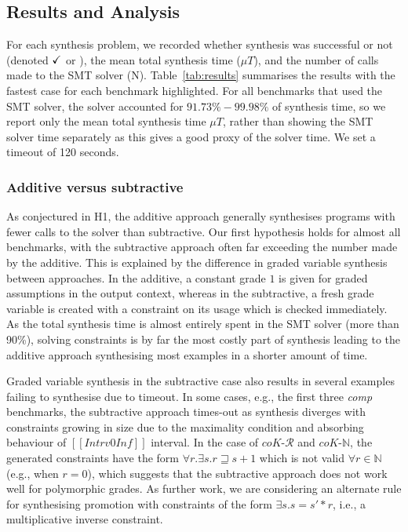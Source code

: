\subsection{Results and Analysis}
%
For each synthesis problem, we recorded whether synthesis was successful or not
(denoted $\checkmark$ or \fail), the mean total synthesis time ($\mu{T}$), and the
number of calls made to the SMT solver (\textsc{N}). Table~\ref{tab:results}
summarises the results with the fastest case for each benchmark highlighted. For
all benchmarks that used the SMT solver, the solver accounted for
$91.73\%-99.98\%$ of synthesis time, so we report only the mean total synthesis
time $\mu{T}$, rather than showing the SMT solver time separately as this gives
a good proxy of the solver time. We set a timeout of 120 seconds.

\subsubsection{Additive versus subtractive}

As conjectured in H1, the additive approach generally synthesises programs with
fewer calls to the solver than subtractive. Our first hypothesis holds for
almost all benchmarks, with the subtractive approach often far exceeding the
number made by the additive. This is explained by the difference in graded
variable synthesis between approaches. In the additive, a constant grade $1$ is
given for graded assumptions in the output context, whereas in the subtractive,
a fresh grade variable is created with a constraint on its usage which is
checked immediately. As the total synthesis time is almost entirely spent in the
SMT solver (more than 90\%), solving constraints is by far the most costly part
of synthesis leading to the additive approach synthesising most examples in a
shorter amount of time.

Graded variable synthesis in the subtractive case also results in several
examples failing to synthesise due to timeout. In some cases, e.g., the first three
\textit{comp} benchmarks, the subtractive approach times-out as synthesis
diverges with constraints growing in size due to the maximality condition and
absorbing behaviour of $[[ Intrv 0 Inf ]]$ interval. In the case of
$\textit{coK-$\mathcal{R}$}$ and $\textit{coK-$\mathbb{N}$}$, the generated
constraints have the form $\forall r. \exists s. r \sqsupseteq s + 1 $ which is
not valid $\forall r \in \mathbb{N}$ (e.g., when $r = 0$), which suggests that
the subtractive approach does not work well for polymorphic grades. As further
work, we are considering an alternate rule for synthesising promotion with
constraints of the form $\exists s . s = s' * r$, i.e., a multiplicative inverse
constraint.


